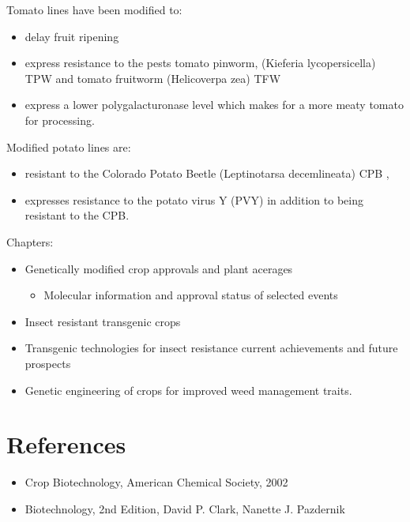 \documentclass[nofonts,]{tufte-handout}
\providecommand{\tightlist}{%
  \setlength{\itemsep}{0pt}\setlength{\parskip}{0pt}}
\begin{document}
Tomato lines have been modified to:

\begin{itemize}
\tightlist
\item
  delay fruit ripening
\item
  express resistance to the pests tomato pinworm, (Kieferia
  lycopersicella) TPW and tomato fruitworm (Helicoverpa zea) TFW
\item
  express a lower polygalacturonase level which makes for a more meaty
  tomato for processing.
\end{itemize}

Modified potato lines are:

\begin{itemize}
\tightlist
\item
  resistant to the Colorado Potato Beetle (Leptinotarsa decemlineata)
  CPB ,
\item
  expresses resistance to the potato virus Y (PVY) in addition to being
  resistant to the CPB.
\end{itemize}

Chapters:

\begin{itemize}
\item
  Genetically modified crop approvals and plant acerages

  \begin{itemize}
  \tightlist
  \item
    Molecular information and approval status of selected events
  \end{itemize}
\item
  Insect resistant transgenic crops
\item
  Transgenic technologies for insect resistance current achievements and
  future prospects
\item
  Genetic engineering of crops for improved weed management traits.
\end{itemize}

\hypertarget{references}{%
\section{References}\label{references}}

\begin{itemize}
\tightlist
\item
  Crop Biotechnology, American Chemical Society, 2002
\item
  Biotechnology, 2nd Edition, David P. Clark, Nanette J. Pazdernik
\end{itemize}


\end{document}

